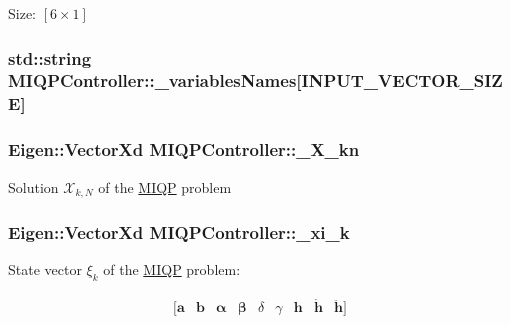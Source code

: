 \-Size\-: $[6\times1]$ \hypertarget{classMIQPController_a2c3ddd93fd843a3a4650314b47436be7}{
\subsubsection[{\-\_\-variables\-Names}]{\setlength{\rightskip}{0pt plus 5cm}std\-::string {\bf \-M\-I\-Q\-P\-Controller\-::\-\_\-variables\-Names}\mbox{[}{\bf \-I\-N\-P\-U\-T\-\_\-\-V\-E\-C\-T\-O\-R\-\_\-\-S\-I\-Z\-E}\mbox{]}}}\label{classMIQPController_a2c3ddd93fd843a3a4650314b47436be7}
\hypertarget{classMIQPController_a1fdfcba2c7b6422ac8d3b0b6095d7546}{
\subsubsection[{\-\_\-\-X\-\_\-kn}]{\setlength{\rightskip}{0pt plus 5cm}\-Eigen\-::\-Vector\-Xd {\bf \-M\-I\-Q\-P\-Controller\-::\-\_\-\-X\-\_\-kn}}}\label{classMIQPController_a1fdfcba2c7b6422ac8d3b0b6095d7546}
\-Solution $\mathcal{X}_{k,N}$ of the \hyperlink{namespaceMIQP}{\-M\-I\-Q\-P} problem \hypertarget{classMIQPController_ad1c63725dab2ce84382fcb0b071325ed}{
\subsubsection[{\-\_\-xi\-\_\-k}]{\setlength{\rightskip}{0pt plus 5cm}\-Eigen\-::\-Vector\-Xd {\bf \-M\-I\-Q\-P\-Controller\-::\-\_\-xi\-\_\-k}}}\label{classMIQPController_ad1c63725dab2ce84382fcb0b071325ed}
\-State vector $\xi_k$ of the \hyperlink{namespaceMIQP}{\-M\-I\-Q\-P} problem\-:

\[ \begin{array}{ccccccccc} [\mathbf{a} & \mathbf{b} & \mathbf{\alpha} & \mathbf{\beta} & \delta & \gamma & \mathbf{h} & \dot{\mathbf{h}} & \ddot{\mathbf{h}}] \end{array} \]

